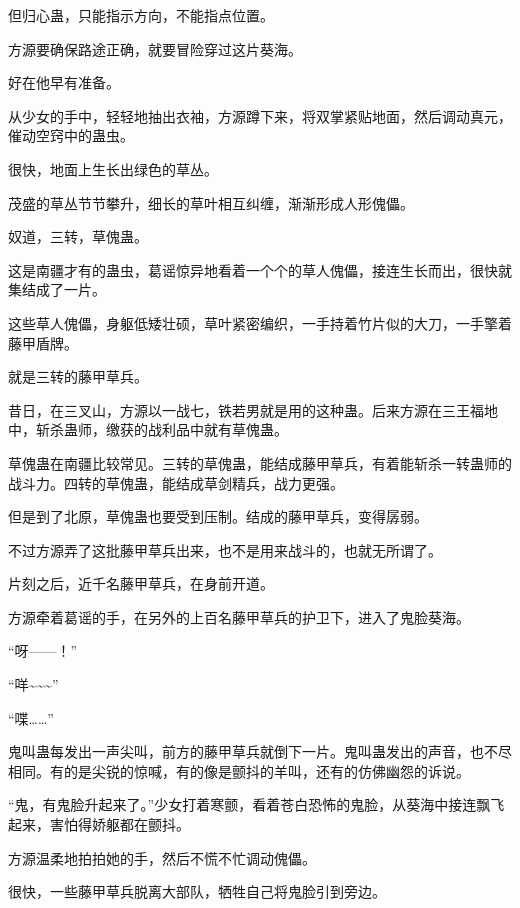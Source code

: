 \begin{this_body}
但归心蛊，只能指示方向，不能指点位置。

方源要确保路途正确，就要冒险穿过这片葵海。

好在他早有准备。

从少女的手中，轻轻地抽出衣袖，方源蹲下来，将双掌紧贴地面，然后调动真元，催动空窍中的蛊虫。

很快，地面上生长出绿色的草丛。

茂盛的草丛节节攀升，细长的草叶相互纠缠，渐渐形成人形傀儡。

奴道，三转，草傀蛊。

这是南疆才有的蛊虫，葛谣惊异地看着一个个的草人傀儡，接连生长而出，很快就集结成了一片。

这些草人傀儡，身躯低矮壮硕，草叶紧密编织，一手持着竹片似的大刀，一手擎着藤甲盾牌。

就是三转的藤甲草兵。

昔日，在三叉山，方源以一战七，铁若男就是用的这种蛊。后来方源在三王福地中，斩杀蛊师，缴获的战利品中就有草傀蛊。

草傀蛊在南疆比较常见。三转的草傀蛊，能结成藤甲草兵，有着能斩杀一转蛊师的战斗力。四转的草傀蛊，能结成草剑精兵，战力更强。

但是到了北原，草傀蛊也要受到压制。结成的藤甲草兵，变得孱弱。

不过方源弄了这批藤甲草兵出来，也不是用来战斗的，也就无所谓了。

片刻之后，近千名藤甲草兵，在身前开道。

方源牵着葛谣的手，在另外的上百名藤甲草兵的护卫下，进入了鬼脸葵海。

“呀——！”

“咩\~{}\~{}\~{}”

“喋……”

鬼叫蛊每发出一声尖叫，前方的藤甲草兵就倒下一片。鬼叫蛊发出的声音，也不尽相同。有的是尖锐的惊喊，有的像是颤抖的羊叫，还有的仿佛幽怨的诉说。

“鬼，有鬼脸升起来了。”少女打着寒颤，看着苍白恐怖的鬼脸，从葵海中接连飘飞起来，害怕得娇躯都在颤抖。

方源温柔地拍拍她的手，然后不慌不忙调动傀儡。

很快，一些藤甲草兵脱离大部队，牺牲自己将鬼脸引到旁边。

\end{this_body}


